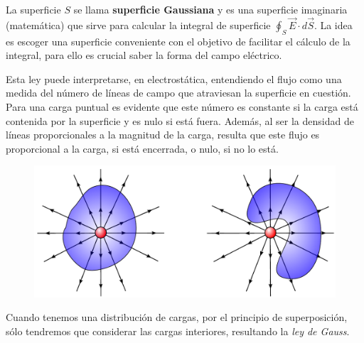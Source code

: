 La superficie $S$ se llama \textbf{superficie Gaussiana} y es una superficie imaginaria (matemática) que sirve para calcular la integral de superficie $\oint_S \vec{E} \cdot d\vec{S}$. La idea es escoger una superficie conveniente con el objetivo de facilitar el cálculo de la integral, para ello es crucial saber la forma del campo eléctrico.

Esta ley puede interpretarse, en electrostática, entendiendo el flujo como una medida del número de líneas de campo que atraviesan la superficie en cuestión. Para una carga puntual es evidente que este número es constante si la carga está contenida por la superficie y es nulo si está fuera. Además, al ser la densidad de líneas proporcionales a la magnitud de la carga, resulta que este flujo es proporcional a la carga, si está encerrada, o nulo, si no lo está.

\begin{figure}[H]
    \centering
    \includegraphics[scale = 0.6]{Figuras/LeyGauss.pdf}
    \caption{}
    \label{fig:Gauss-Law}
\end{figure}

Cuando tenemos una distribución de cargas, por el principio de superposición, sólo tendremos que considerar las cargas interiores, resultando la \textit{ley de Gauss}.

